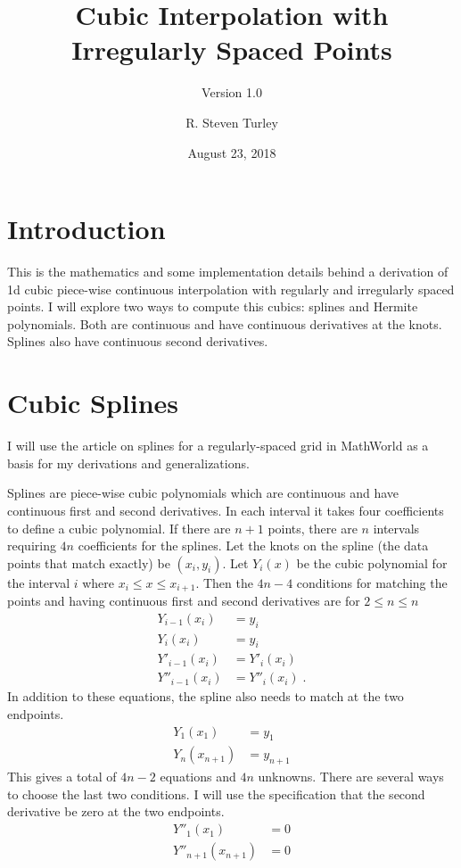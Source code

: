 \documentclass{scrartcl}
\title{Cubic Interpolation with Irregularly Spaced Points}
\subtitle{Version 1.0}
\author{R. Steven Turley}
\date{August 23, 2018}
\begin{document}
\maketitle
\tableofcontents

\section{Introduction}
This is the mathematics and some implementation details
behind a derivation of 1d cubic piece-wise continuous
interpolation with regularly and irregularly spaced points.
I will explore two ways to compute this cubics: splines and
Hermite polynomials. Both are continuous and have continuous
derivatives at the knots. Splines also have continuous second
derivatives.

\section{Cubic Splines}

I will use the article on splines for a regularly-spaced
grid in MathWorld\cite{mathworld} as a basis for my
derivations and generalizations.

Splines are piece-wise cubic polynomials which are continuous
and have continuous first and second derivatives. In each interval
it takes four coefficients to define a cubic polynomial. If there
are $n+1$ points, there are $n$ intervals requiring $4n$ coefficients
for the splines. Let the knots on the spline (the data points that
match exactly) be $(x_i,y_i)$. Let $Y_i(x)$ be the cubic polynomial for
the interval $i$ where $x_i\leq x\leq x_{i+1}$. Then the $4n-4$ conditions
for matching the points and having continuous first and second derivatives
are for $2\leq n \leq n$
\begin{align}
Y_{i-1}(x_i) &= y_i \label{eq:cbegin} \\
Y_i(x_i) &= y_i\\
Y'_{i-1}(x_i) &= Y'_i(x_i)\\
Y''_{i-1}(x_i) &= Y''_i(x_i)\;. \label{eq:c2}
\end{align}
In addition to these equations, the spline also needs to match
at the two endpoints.
\begin{align}
Y_1(x_1) &= y_1\\
Y_n(x_{n+1}) &= y_{n+1}
\end{align}
This gives a total of $4n-2$ equations and $4n$ unknowns. There
are several ways to choose the last two conditions. I will use the
specification that the second derivative be zero at the two endpoints.
\begin{align}
Y''_1(x_1) &= 0 \label{eq:bslope}\\
Y''_{n+1}(x_{n+1}) &= 0 \label{eq:eslope}
\end{align}
\end{document}
